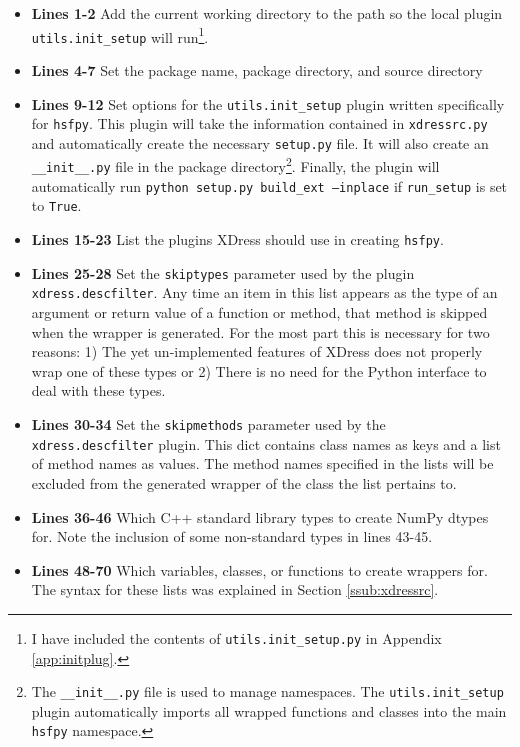   \begin{itemize}
    \item \textbf{Lines 1-2} Add the current working directory to the path so the local plugin \texttt{utils.init\_setup} will run\footnote{I have included the contents of \texttt{utils.init\_setup.py} in Appendix \ref{app:initplug}.}.
    \item \textbf{Lines 4-7} Set the package name, package directory, and source directory
    \item \textbf{Lines 9-12} Set options for the \texttt{utils.init\_setup} plugin written specifically for \texttt{hsfpy}. This plugin will take the information contained in \texttt{xdressrc.py} and automatically create the necessary \texttt{setup.py} file. It will also create an \texttt{\_\_init\_\_.py} file in the package directory\footnote{The \texttt{\_\_init\_\_.py} file is used to manage namespaces. The \texttt{utils.init\_setup} plugin automatically imports all wrapped functions and classes into the main \texttt{hsfpy} namespace.}. Finally, the plugin will automatically run \texttt{python setup.py build\_ext --inplace} if \texttt{run\_setup} is set to \texttt{True}.
    \item \textbf{Lines 15-23} List the plugins XDress should use in creating \texttt{hsfpy}.
    \item \textbf{Lines 25-28} Set the \texttt{skiptypes} parameter used by the plugin \texttt{xdress.descfilter}. Any time an item in this list appears as the type of an argument or return value of a function or method, that method is skipped when the wrapper is generated. For the most part this is necessary for two reasons: 1) The yet un-implemented features of XDress does not properly wrap one of these types or 2) There is no need for the Python interface to deal with these types.
    \item \textbf{Lines 30-34} Set the \texttt{skipmethods} parameter used by the \texttt{xdress.descfilter} plugin. This dict contains class names as keys and a list of method names as values. The method names specified in the lists will be excluded from the generated wrapper of the class the list pertains to.
    \item \textbf{Lines 36-46} Which C++ standard library types to create NumPy dtypes for. Note the inclusion of some non-standard types in lines 43-45.
    \item \textbf{Lines 48-70} Which variables, classes, or functions to create wrappers for. The syntax for these lists was explained in Section \ref{ssub:xdressrc}.
  \end{itemize}
  \mainstretch{}

